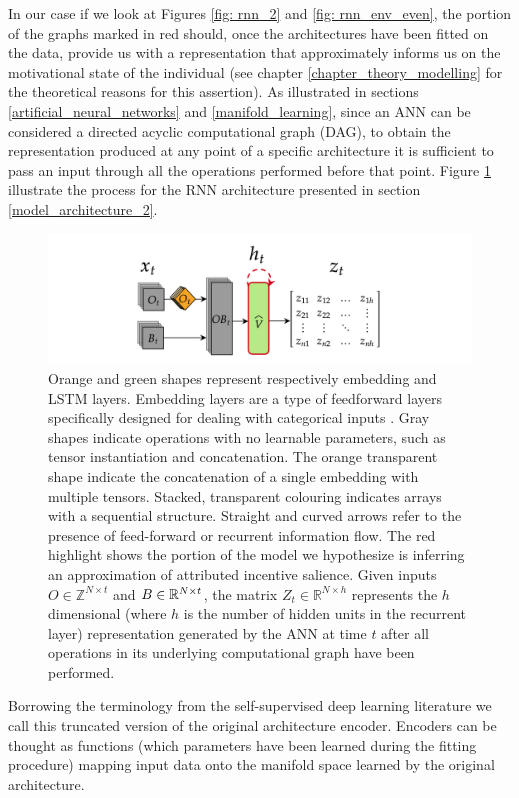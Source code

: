 In our case if we look at Figures \ref{fig: rnn_2} and \ref{fig: rnn_env_even}, the portion of the graphs marked in red should, once the architectures have been fitted on the data,  provide us with a representation that approximately informs us on the motivational state of the individual (see chapter \ref{chapter_theory_modelling} for the theoretical reasons for this assertion). As illustrated in sections \ref{artificial_neural_networks} and \ref{manifold_learning}, since an ANN can be considered a directed acyclic computational graph (DAG), to obtain the representation produced at any point of a specific architecture it is sufficient to pass an input through all the operations performed before that point. Figure \ref{fig: repr_extr} illustrate the process for the RNN architecture presented in section \ref{model_architecture_2}.
\begin{figure}[h]
  \centering
  \includegraphics[width=\textwidth]{images/chapter_4/representation_extractor.png}
    \caption[\textbf{The procedure for generating latent representations generated by an ANN}]{Orange and green shapes represent respectively embedding and LSTM layers. Embedding layers are a type of feedforward layers specifically designed for dealing with categorical inputs \cite{chollet2015keras}. Gray shapes indicate operations with no learnable parameters, such as tensor instantiation and concatenation. The orange transparent shape indicate the concatenation of a single embedding with multiple tensors. Stacked, transparent colouring indicates arrays with a sequential structure. Straight and curved arrows refer to the presence of feed-forward or recurrent information flow. The red highlight shows the portion of the model we hypothesize is inferring an approximation of attributed incentive salience. Given inputs $O \in \mathbb{Z}^{N \times t}$ and $B \in \mathbb{R}^{N \times t \time 5}$, the matrix $Z_t \in \mathbb{R}^{N \times h}$ represents the $h$ dimensional (where $h$ is the number of hidden units in the recurrent layer) representation generated by the ANN at time $t$ after all operations in its underlying computational graph have been performed.}
    \label{fig: repr_extr}
\end{figure}
Borrowing the terminology from the self-supervised deep learning literature \cite{bengio2017deep} we call this truncated version of the original architecture encoder. Encoders can be thought as functions (which parameters have been learned during the fitting procedure) mapping input data onto the manifold space learned by the original architecture.

